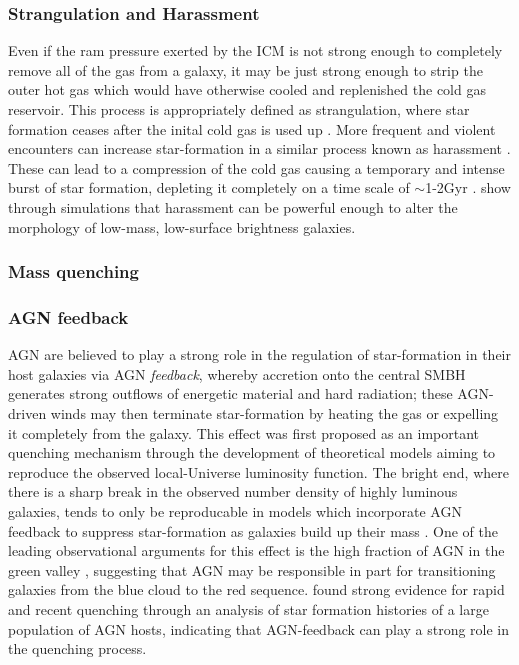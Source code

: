 \subsubsection{Strangulation and Harassment}

Even if the ram pressure exerted by the ICM is not strong enough to completely remove all of the gas from a galaxy, it may be just strong enough to strip the outer hot gas which would have otherwise cooled and replenished the cold gas reservoir. This process is appropriately defined as strangulation, where star formation ceases after the inital cold gas is used up \citep{Larson1980}. More frequent and violent encounters can increase star-formation in a similar process known as harassment \citep{Moore1996}. These can lead to a compression of the cold gas causing a temporary and intense burst of star formation, depleting it completely on a time scale of $\sim$1-2Gyr \citep{Kawata2007}. \citet{Moore1999} show through simulations that harassment can be powerful enough to alter the morphology of low-mass, low-surface brightness galaxies. 

\subsubsection{Mass quenching}
\subsubsection{AGN feedback}
AGN are believed to play a strong role in the regulation of star-formation in their host galaxies via AGN \emph{feedback}, whereby accretion onto the central SMBH generates strong outflows of energetic material and hard radiation; these AGN-driven winds may then terminate star-formation by heating the gas or expelling it completely from the galaxy. This effect was first proposed as an important quenching mechanism through the development of theoretical models aiming to reproduce the observed local-Universe luminosity function. The bright end, where there is a sharp break in the observed number density of highly luminous galaxies, tends to only be reproducable in models which incorporate AGN feedback to suppress star-formation as galaxies build up their mass \citep{Benson2003, DiMatteo2005, Bower2006, Croton2006, Somerville2008}. One of the leading observational arguments for this effect is the high fraction of AGN in the green valley \citep{Martin2007a,Schawinski2010}, suggesting that AGN may be responsible in part for transitioning galaxies from the blue cloud to the red sequence. \citet{Smethurst2016} found strong evidence for rapid and recent quenching through an analysis of star formation histories of a large population of AGN hosts, indicating that AGN-feedback can play a strong role in the quenching process.  

